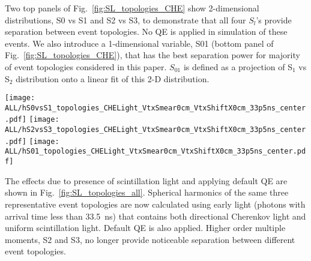 Two top panels of Fig.~\ref{fig:SL_topologies_CHE} show 2-dimensional distributions, S0 vs S1 and S2 vs S3, to demonstrate that all four $S_l$'s provide separation between event topologies. No QE is applied in simulation of these events. We also introduce a 1-dimensional variable, S01 (bottom panel of Fig.~\ref{fig:SL_topologies_CHE}), that has the best separation power for majority of event topologies considered in this paper. $S_{01}$ is defined as a projection of S$_1$ vs S$_2$ distribution onto a linear fit of this 2-D distribution.

\begin{figure*}[h]
  \centering
  \texttt{[image: ALL/hS0vsS1\_topologies\_CHELight\_VtxSmear0cm\_VtxShiftX0cm\_33p5ns\_center.pdf]}
  \texttt{[image: ALL/hS2vsS3\_topologies\_CHELight\_VtxSmear0cm\_VtxShiftX0cm\_33p5ns\_center.pdf]}
  \texttt{[image: ALL/hS01\_topologies\_CHELight\_VtxSmear0cm\_VtxShiftX0cm\_33p5ns\_center.pdf]}
  \caption{Spherical harmonics for three event topologies: two
    back-to-back 1.26~MeV electrons (\emph{black squares and black
      dotted line}), two 1.26~MeV electrons at 90$^{\circ}$ angle
    (\emph{blue triangles and blue dashed line}), and a single
    2.529~MeV electron representing $^{8}$B background (\emph{red
      crosses and red solid line}). Simulation of 1000 events
    originated at the center of the sphere. Perfect separation between
    Cherenkov and scintillation light is implemented in this
    simulation by using only Cherenkov photons. \emph{Top left:} $S_0$
    versus $S_1$ scatter plot. Black dotted line is a linear fit of
    the 90$^{\circ}$ topology and $^{8}$B events. Variable $S_{01}$ is
    defined as a projection of 2D distribution onto this linear
    fit. \emph{Top right:} $S_2$ versus $S_3$ scatter
    plot. \emph{Bottom:} $S_{01}$ distributions for the three
    topologies. These distributions are normalized to unit area for
    shape comparison.}
  \label{fig:SL_topologies_CHE}
\end{figure*}


The effects due to presence of scintillation light and applying default QE are shown in Fig.~\ref{fig:SL_topologies_all}. Spherical harmonics of the same three representative event topologies are now calculated using early light (photons with arrival time less than 33.5~ns) that contains both directional Cherenkov light and uniform scintillation light. Default QE is also applied. Higher order multiple moments, S2 and S3, no longer provide noticeable separation between different event topologies.


